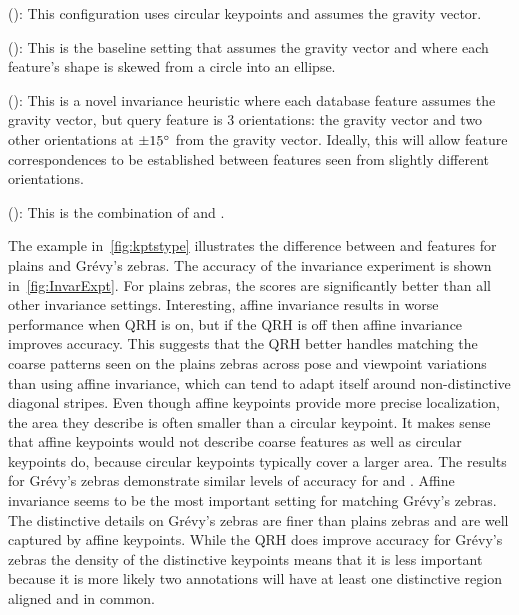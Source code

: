         \FloatBarrier{}
        \begin{itemln}

            \item \NoInvar{} (): %
                This configuration uses circular keypoints and assumes the gravity vector.

            \item \AIAlone{} (): %
                This is the baseline setting that assumes the gravity vector and where each feature's shape is skewed
                  from a circle into an ellipse.

            \item \QRHCirc{} (): %
                This is a novel invariance heuristic where each {database} feature assumes the gravity vector, but
                  {query} feature is $3$ orientations:
                the gravity vector and two other orientations at $\pm15^{\circ}$ from the gravity vector.
                Ideally, this will allow feature correspondences to be established between features seen from
                  slightly different orientations.

            \item \QRHEll{} (): %
                This is the combination of \QRHCirc{} and \AIAlone{}.

        \end{itemln}
        \FloatBarrier{}

        The example in~\cref{fig:kptstype} illustrates the difference between \AIAlone{} and \QRHCirc{} features
          for plains and Grévy's zebras.
        The accuracy of the invariance experiment is shown in~\cref{fig:InvarExpt}.
        For plains zebras, the \QRHCirc{} scores are significantly better than all other invariance settings.
        Interesting, affine invariance results in worse performance when QRH is on, but if the QRH is off then
          affine invariance improves accuracy.
        This suggests that the QRH better handles matching the coarse patterns seen on the plains zebras across
          pose and viewpoint variations than using affine invariance, which can tend to adapt itself around
          non-distinctive diagonal stripes.
        Even though affine keypoints provide more precise localization, the area they describe is often smaller
          than a circular keypoint.
        It makes sense that affine keypoints would not describe coarse features as well as circular keypoints do,
          because circular keypoints typically cover a larger area.
        The results for Grévy's zebras demonstrate similar levels of accuracy for \AIAlone{} and \QRHEll{}.
        Affine invariance seems to be the most important setting for matching Grévy's zebras.
        The distinctive details on Grévy's zebras are finer than plains zebras and are well captured by affine
          keypoints.
        While the QRH does improve accuracy for Grévy's zebras the density of the distinctive keypoints means
          that it is less important because it is more likely two annotations will have at least one distinctive
          region aligned and in common.

